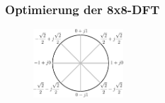 \begin{frame}\frametitle{Optimierung der 8x8-DFT}
\vspace{0.3cm}
   \begin{figure}[!h]
  \centering
  \includegraphics[width=0.3\textwidth]{img/Einheitskreis-crop.pdf}
  \label{pic:Einheitskreis_Faktoren}
\end{figure}

\vspace{-0.3cm}
\begin{center}
 \begin{minipage}{0.9\textwidth}
\begingroup


\end{minipage}
\end{center}
\end{frame}
